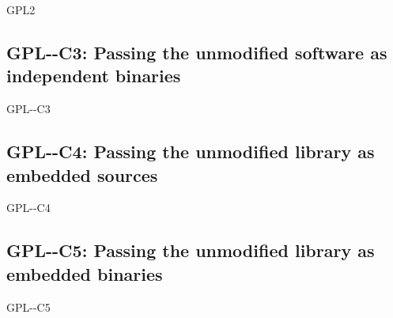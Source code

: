 \begin{license}{GPL2}
\subsection{GPL-\ver-C3: Passing the unmodified software as independent binaries} 
\begin{lsuc}{GPL-\ver-C3}

  \useCaseThree{\ver}
  \coversThree

  \begin{lsucrequires}
    \lsucmandatory{\keepLicenseElements}
    \lsucmandatory{\gpltwoEnsureCopyrightNoticeBinary}
    \lsucmandatory{\giveLicense}\passingFilesCorrectly  
    \lsucmandatory{\makeUnmodifiedSourceAvailable}
    \lsucmandatory{\describeHowToGetSource}
    \lsucmandatory{\retainCopyrightNotices}
    \lsucoptional{\addToDocumentation}
  \end{lsucrequires}

  \lsucprohibitsnothing
\end{lsuc}

\subsection{GPL-\ver-C4: Passing the unmodified library as embedded sources}
\begin{lsuc}{GPL-\ver-C4}

  \useCaseFour{\ver}
  \coversFour

  \begin{lsucrequires}
    \lsucmandatory{\keepLicenseElements}
    \lsucmandatory{\gpltwoEnsureCopyrightNoticeSource}
    \lsucmandatory{\giveLicense}\passingFilesCorrectly
    \lsucmandatory{\retainCopyrightNotices}
    \lsucmandatory{\addToCopyrightDialogLib}
    \lsucmandatory{\arrangeEnclosingSources}
    \lsucoptional{\addToDocumentation}
  \end{lsucrequires}

  \lsucprohibitsnothing
\end{lsuc}

\subsection{GPL-\ver-C5: Passing the unmodified library as embedded binaries} 
\begin{lsuc}{GPL-\ver-C5}


\end{lsuc}
\end{license}
